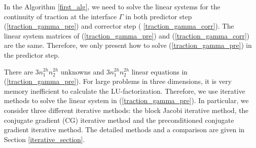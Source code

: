 In the Algorithm \ref{first_alg}, we need to solve the linear systems for the continuity of traction at the interface $\Gamma$ in both predictor step (\ref{traction_gamma_pre}) and corrector step (
\ref{traction_gamma_corr}). The linear system matrices of (\ref{traction_gamma_pre}) and (\ref{traction_gamma_corr}) are the same. Therefore, we only present how to solve (\ref{traction_gamma_pre}) in the predictor step.

There are $3n_1^{2h}n_2^{2h}$ unknowns and $3n_1^{2h}n_2^{2h}$ linear equations in (\ref{traction_gamma_pre}). For large problems in three dimensions, it is very memory inefficient to calculate the LU-factorization. Therefore, we use iterative methods to solve the linear system in (\ref{traction_gamma_pre}). In particular, we consider three different iterative methods: the block Jacobi iterative method, the conjugate gradient (CG) iterative method and the preconditioned conjugate gradient iterative method. The detailed methods and a comparison are given in Section \ref{iterative_section}.